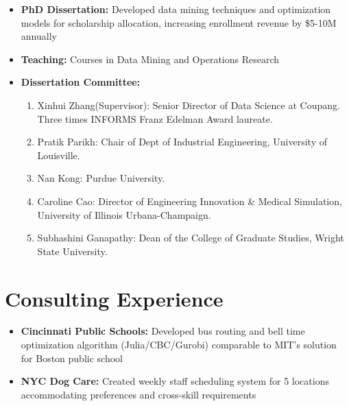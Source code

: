 \documentclass[12pt,a4paper,sans]{moderncv}
\begin{document}
{
    \begin{itemize}
        \item \textbf{PhD Dissertation:} Developed data mining techniques and optimization models for scholarship allocation, increasing enrollment revenue by \$5-10M annually
        \item \textbf{Teaching:} Courses in Data Mining and Operations Research
            \item \textbf{Dissertation Committee:}
    \begin{enumerate}
\item Xinhui Zhang(Supervisor): Senior Director of Data Science at Coupang. Three times INFORMS Franz Edelman Award laureate.
\item Pratik Parikh: Chair of Dept of Industrial Engineering, University of Louisville.
\item Nan Kong: Purdue University. 
\item Caroline Cao: Director of Engineering Innovation \& Medical Simulation, University of Illinois Urbana-Champaign.
\item Subhashini Ganapathy: Dean of the College of Graduate Studies, Wright State University.
\end{enumerate}
    \end{itemize}
}

\section{Consulting Experience}
{
    \begin{itemize}
        \item \textbf{Cincinnati Public Schools:} Developed bus routing and bell time optimization algorithm (Julia/CBC/Gurobi) comparable to MIT's solution for Boston public school
        \item \textbf{NYC Dog Care:} Created weekly staff scheduling system for 5 locations accommodating preferences and cross-skill requirements
    \end{itemize}
}
\end{document}
